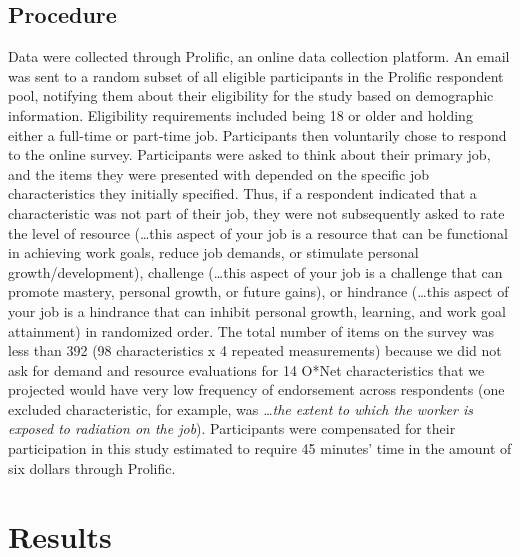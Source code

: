 \documentclass[
  english,
  man]{apa6}
\begin{document}
\hypertarget{procedure}{%
\subsection{Procedure}\label{procedure}}

Data were collected through Prolific, an online data collection platform. An email was sent to a random subset of all eligible participants in the Prolific respondent pool, notifying them about their eligibility for the study based on demographic information. Eligibility requirements included being 18 or older and holding either a full-time or part-time job. Participants then voluntarily chose to respond to the online survey. Participants were asked to think about their primary job, and the items they were presented with depended on the specific job characteristics they initially specified. Thus, if a respondent indicated that a characteristic was not part of their job, they were not subsequently asked to rate the level of resource (\ldots this aspect of your job is a resource that can be functional in achieving work goals, reduce job demands, or stimulate personal growth/development), challenge (\ldots this aspect of your job is a challenge that can promote mastery, personal growth, or future gains), or hindrance (\ldots this aspect of your job is a hindrance that can inhibit personal growth, learning, and work goal attainment) in randomized order. The total number of items on the survey was less than 392 (98 characteristics x 4 repeated measurements) because we did not ask for demand and resource evaluations for 14 O*Net characteristics that we projected would have very low frequency of endorsement across respondents (one excluded characteristic, for example, was \emph{\ldots the extent to which the worker is exposed to radiation on the job}). Participants were compensated for their participation in this study estimated to require 45 minutes' time in the amount of six dollars through Prolific.

\hypertarget{results}{%
\section{Results}\label{results}}
\end{document}
